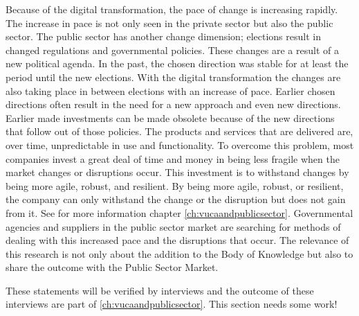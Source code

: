 Because of the digital transformation, the pace of change is increasing rapidly. The increase in pace is not only seen in the private sector but also the public sector. The public sector has another change dimension; elections result in changed regulations and governmental policies. These changes are a result of a new political agenda. In the past, the chosen direction was stable for at least the period until the new elections. With the digital transformation the changes are also taking place in between elections with an increase of pace. Earlier chosen directions often result in the need for a new approach and even new directions. Earlier made investments can be made obsolete because of the new directions that follow out of those policies. The products and services that are delivered are, over time, unpredictable in use and functionality. To overcome this problem, most companies invest a great deal of time and money in being less fragile when the market changes or disruptions occur. This investment is to withstand changes by being more agile, robust, and resilient. By being more agile, robust, or resilient, the company can only withstand the change or the disruption but does not gain from it. See for more information chapter \ref{ch:vucaandpublicsector}. Governmental agencies and suppliers in the public sector market are searching for methods of dealing with this increased pace and the disruptions that occur. The relevance of this research is not only about the addition to the Body of Knowledge but also to share the outcome with the Public Sector Market.

\begin{remark}
	These statements will be verified by interviews and the outcome of these interviews are part of \ref{ch:vucaandpublicsector}.
	This section needs some work!
\end{remark}
